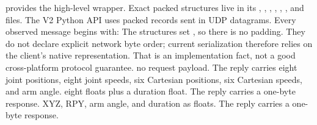 {}
\markdownRendererSectionEnd \markdownRendererSectionBegin
{}\markdownRendererInterblockSeparator
{}\markdownRendererBlockQuoteBegin
{}  provides the high-level wrapper. Exact packed structures live in its , , , , , , and  files.\markdownRendererBlockQuoteEnd \markdownRendererInterblockSeparator
{}The V2 Python API uses packed  records sent in UDP datagrams. Every observed message begins with:\markdownRendererInterblockSeparator
{}\markdownRendererInterblockSeparator
{}The structures set , so there is no padding. They do not declare explicit network byte order; current serialization therefore relies on the client's native representation. That is an implementation fact, not a good cross-platform protocol guarantee.\markdownRendererInterblockSeparator
{}\markdownRendererSectionBegin
{}\markdownRendererInterblockSeparator
{}\markdownRendererUlBegin
\markdownRendererUlItem {} no request payload. The reply carries eight joint positions, eight joint speeds, six Cartesian positions, six Cartesian speeds, and arm angle.\markdownRendererUlItemEnd 
\markdownRendererUlItem {} eight floats plus a duration float. The reply carries a one-byte response.\markdownRendererUlItemEnd 
\markdownRendererUlItem {} XYZ, RPY, arm angle, and duration as floats. The reply carries a one-byte response.\markdownRendererUlItemEnd 
